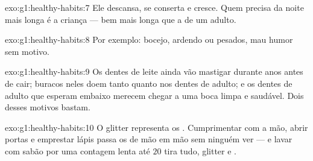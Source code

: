 \begin{solution}{exo:g1:healthy-habits:7}
Ele descansa, se conserta e cresce. Quem precisa da noite mais longa
é a criança --- bem mais longa que a de um adulto.
\end{solution}

\begin{solution}{exo:g1:healthy-habits:8}
Por exemplo: bocejo,  ardendo ou pesados, mau humor sem motivo.
\end{solution}

\begin{solution}{exo:g1:healthy-habits:9}
Os dentes de leite ainda vão mastigar durante anos antes de cair;
buracos neles doem tanto quanto nos dentes de adulto; e os dentes de
adulto que esperam embaixo merecem chegar a uma boca limpa e
saudável. Dois desses motivos bastam.
\end{solution}

\begin{solution}{exo:g1:healthy-habits:10}
O glitter representa os . Cumprimentar com a mão, abrir
portas e emprestar lápis passa os  de mão em mão sem
ninguém ver --- e lavar com sabão por uma contagem lenta até $20$
tira tudo, glitter e .
\end{solution}
